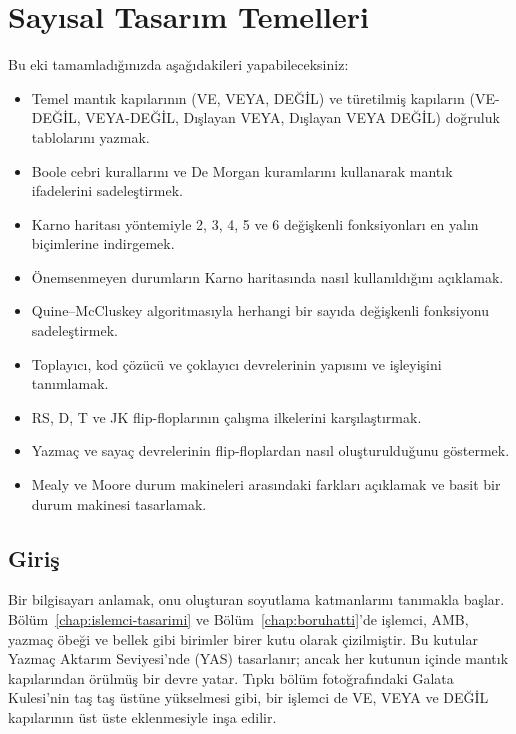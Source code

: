 ﻿\chapter{Sayısal Tasarım Temelleri}
\label{ch:sayisal-tasarim}

\begin{tcolorbox}[
    colback=blokyesil!15,
    colframe=sinyalyesil!60!black,
    title={\textbf{Öğrenme Hedefleri}},
    fonttitle=\bfseries,
    rounded corners,
    boxrule=0.8pt
]
Bu eki tamamladığınızda aşağıdakileri yapabileceksiniz:
\begin{itemize}[nosep, leftmargin=*]
    \item Temel mantık kapılarının (VE, VEYA, DEĞİL) ve türetilmiş kapıların (VE-DEĞİL, VEYA-DEĞİL, Dışlayan VEYA, Dışlayan VEYA DEĞİL) doğruluk tablolarını yazmak.
    \item Boole cebri kurallarını ve De Morgan kuramlarını kullanarak mantık ifadelerini sadeleştirmek.
    \item Karno haritası yöntemiyle 2, 3, 4, 5 ve 6 değişkenli fonksiyonları en yalın biçimlerine indirgemek.
    \item Önemsenmeyen durumların Karno haritasında nasıl kullanıldığını açıklamak.
    \item Quine--McCluskey algoritmasıyla herhangi bir sayıda değişkenli fonksiyonu sadeleştirmek.
    \item Toplayıcı, kod çözücü ve çoklayıcı devrelerinin yapısını ve işleyişini tanımlamak.
    \item RS, D, T ve JK flip-floplarının çalışma ilkelerini karşılaştırmak.
    \item Yazmaç ve sayaç devrelerinin flip-floplardan nasıl oluşturulduğunu göstermek.
    \item Mealy ve Moore durum makineleri arasındaki farkları açıklamak ve basit bir durum makinesi tasarlamak.
\end{itemize}
\end{tcolorbox}

\section{Giriş}

Bir bilgisayarı anlamak, onu oluşturan soyutlama katmanlarını tanımakla başlar. Bölüm~\ref{chap:islemci-tasarimi} ve Bölüm~\ref{chap:boruhatti}'de işlemci, AMB, yazmaç öbeği ve bellek gibi birimler birer kutu olarak çizilmiştir. Bu kutular Yazmaç Aktarım Seviyesi'nde (YAS) tasarlanır; ancak her kutunun içinde mantık kapılarından örülmüş bir devre yatar. Tıpkı bölüm fotoğrafındaki Galata Kulesi'nin taş taş üstüne yükselmesi gibi, bir işlemci de VE, VEYA ve DEĞİL kapılarının üst üste eklenmesiyle inşa edilir.

